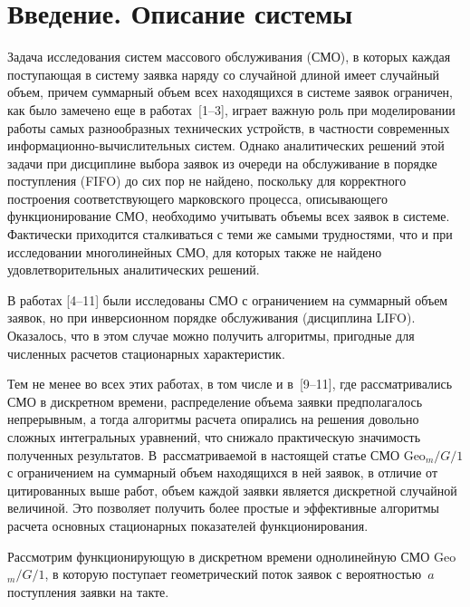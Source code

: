      \begin{multicols}{2}

            \label{st\stat}

\section{Введение. Описание системы}

Задача исследования систем массового обслуживания (СМО),
в которых каждая поступающая в систему заявка наряду со
случайной длиной имеет случайный объем, причем
суммарный объем всех находящихся в системе заявок
ограничен, как было замечено еще в работах~[1--3],
играет важную роль при моделировании работы
самых разнообразных технических устройств, в част\-ности
современных ин\-фор\-ма\-ци\-он\-но-вы\-чис\-ли\-тель\-ных сис\-тем.
Однако аналитических решений этой задачи при дисциплине
выбора заявок из очереди на обслуживание в порядке
поступления (FIFO) до сих пор не найдено, поскольку
для корректного построения соответствующего
марковского процесса, описывающего функционирование СМО,
необходимо учитывать объемы всех заявок в сис\-те\-ме.
Фактически приходится сталкиваться с теми же самыми трудностями, что и при исследовании
многолинейных СМО, для которых также не найдено удовлетворительных аналитических решений.

В работах [4--11]
были исследованы СМО с ограничением на суммарный объем
заявок, но при инверсионном порядке обслуживания (дисциплина LIFO).
Оказалось, что в этом случае можно получить алгоритмы,
пригодные для численных расчетов стационарных характеристик.

Тем не менее во всех этих работах, в том числе и в~[9--11],
где рассматривались СМО в дискретном времени, распределение
объема заявки предполагалось непрерывным, а тогда алгоритмы расчета 
опира\-лись на решения довольно
сложных интегральных уравнений, что снижало практическую
значимость полученных результатов. 
В~рас\-смат\-ри\-ва\-емой в настоящей статье СМО Geo$_m/G/1$
с ограничением на суммарный объем находящихся
в ней заявок, в отличие от цитированных выше работ,
объем каждой заявки является дискретной случайной
величиной. Это позволяет получить более прос\-тые и эффективные
алгоритмы рас\-че\-та основных стационарных показателей функционирования.

Рассмотрим функционирующую в дискретном времени
однолинейную СМО Geo$_m/G/1$, в которую
поступает геометрический поток заявок с ве\-ро\-ят\-ностью~$a$ поступления заявки на такте.


\end{multicols}
